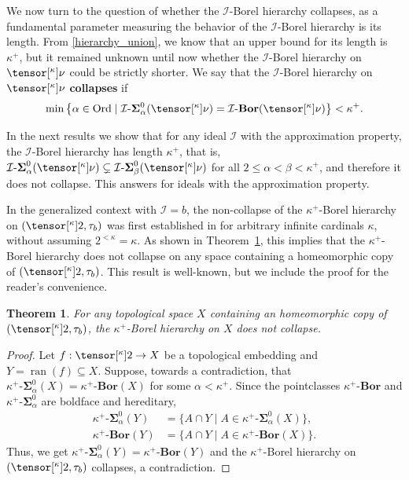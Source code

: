 \documentclass{amsart}
\numberwithin{equation}{section}
\newcommand{\I}{\mathcal{I}}
\newcommand{\pre}[2]{\tensor[^{#1}]{#2}{}}
\newcommand{\markdef}[1]{\textbf{#1}}
\newcommand{\1}{\mathbf{I}}
\newcommand{\2}{\mathbf{II}}
\newcommand{\Bor}{\k^+\text{-}\mathbf{Bor}}
\newcommand{\Sii}[2]{\k^+\text{-}\boldsymbol{\Sigma}^{ #1 }_{ #2}}
\newcommand{\Borid}{\I\text{-}\mathbf{Bor}}
\newcommand{\Siid}[2]{\I\text{-}\boldsymbol{\Sigma}^{ #1 }_{ #2}}
\renewcommand{\a}{\alpha}
\renewcommand{\b}{\beta}
\renewcommand{\k}{\kappa}
\newcommand{\Ord}{\mathrm{Ord}}
\DeclareMathOperator{\ran}{ran}
\newtheorem{theorem}{Theorem}[section]
\theoremstyle{definition}
\theoremstyle{remark}
\begin{document}
We now turn to the question of whether the \(\I\)-Borel hierarchy collapses, as a fundamental parameter measuring the behavior of the \(\I\)-Borel hierarchy is its length. From \eqref{hierarchy_union}, we know that an upper bound for its length is \(\k^+\), but it remained unknown until now whether the \(\I\)-Borel hierarchy on \(\pre{\k}{\nu}\) could be strictly shorter. 
We say that the \(\I\)-Borel hierarchy on \(\pre{\k}{\nu}\) \markdef{collapses} 
if 
\[
\min\left\{\alpha \in \Ord \mid \Siid{0}{\a}(\pre{\k}{\nu}) =\Borid(\pre{\k}{\nu}) \right\}<\k^+.
\]

In the next results we show that for any ideal \(\I\) with the approximation property, the \(\I\)-Borel hierarchy has length \(\k^+\), that is, \(\Siid{0}{\a}(\pre{\k}{\nu}) \subsetneq \Siid{0}{\b}(\pre{\k}{\nu})\) for all \(2 \leq \a<\b<\k^+\), and therefore it does not collapse. This answers \cite[Question 1]{HKSW22} for ideals with the approximation property.


In the generalized context with \(\I=b\), the non-collapse of the \(\k^+\)-Borel hierarchy on $(\pre{\kappa}{2}, \tau_b)$ was first established in \cite[Proposition 4.19]{AMR} for arbitrary infinite cardinals \(\k\), without assuming \(2^{<\k}=\k\). As shown in Theorem~\ref{thrm:collapse_higher_cantor}, this implies that the \(\k^+\)-Borel hierarchy does not collapse on any space containing a homeomorphic copy of $(\pre{\kappa}{2}, \tau_b)$. This result is well-known, but we include the proof for the reader's convenience.

\begin{theorem}\label{thrm:collapse_higher_cantor}
For any topological space $X$ containing an homeomorphic copy of $(\pre{\kappa}{2}, \tau_b)$, the $\kappa^+$-Borel hierarchy on $X$ does not collapse.
\end{theorem}
\begin{proof}
Let $f:\pre{\kappa}{2}\to X$ be a topological embedding and \(Y=\ran(f)\subseteq X \). 
Suppose, towards a contradiction, that \(   \Sii{0}{\a}(X)= \Bor(X)\) for some \(\a<\k^+\).
Since the pointclasses \(\Bor\) and \( \Sii{0}{\a}\) are boldface and hereditary,
    \begin{align*}
    \Sii{0}{\a}(Y)&=\{A \cap Y \mid A \in \Sii{0}{\a}(X)\},\\
     \Bor(Y)&=\{ A \cap Y \mid A \in \Bor(X)\}.
    \end{align*}
Thus, we get \(   \Sii{0}{\a}(Y)= \Bor(Y)\) and the $\kappa^+$-Borel hierarchy on $(\pre{\kappa}{2}, \tau_b)$ collapses, a contradiction. 
\end{proof}
\end{document}
